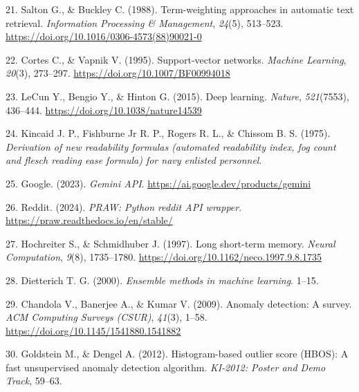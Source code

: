 \documentclass[
  12pt,
  letterpaper,
  DIV=11,
  numbers=noendperiod]{scrartcl}
\newlength{\cslhangindent}
\newenvironment{CSLReferences}[2] %
 {\begin{list}{}{%
  \setlength{\itemindent}{0pt}
  \setlength{\leftmargin}{0pt}
  \setlength{\parsep}{0pt}
  \ifodd #1
   \setlength{\leftmargin}{\cslhangindent}
   \setlength{\itemindent}{-1\cslhangindent}
  \fi
  \setlength{\itemsep}{#2\baselineskip}}}
 {\end{list}}
\begin{document}
\begin{CSLReferences}{1}{0}
21. Salton G., \& Buckley C. (1988). Term-weighting approaches in
automatic text retrieval. \emph{Information Processing \& Management},
\emph{24}(5), 513--523.
\url{https://doi.org/10.1016/0306-4573(88)90021-0}

22. Cortes C., \& Vapnik V. (1995). Support-vector networks.
\emph{Machine Learning}, \emph{20}(3), 273--297.
\url{https://doi.org/10.1007/BF00994018}

23. LeCun Y., Bengio Y., \& Hinton G. (2015). Deep learning.
\emph{Nature}, \emph{521}(7553), 436--444.
\url{https://doi.org/10.1038/nature14539}

24. Kincaid J. P., Fishburne Jr R. P., Rogers R. L., \& Chissom B. S.
(1975). \emph{Derivation of new readability formulas (automated
readability index, fog count and flesch reading ease formula) for navy
enlisted personnel}.

25. Google. (2023). \emph{Gemini API}.
\url{https://ai.google.dev/products/gemini}

26. Reddit. (2024). \emph{{PRAW}: Python reddit API wrapper}.
\url{https://praw.readthedocs.io/en/stable/}

27. Hochreiter S., \& Schmidhuber J. (1997). Long short-term memory.
\emph{Neural Computation}, \emph{9}(8), 1735--1780.
\url{https://doi.org/10.1162/neco.1997.9.8.1735}

28. Dietterich T. G. (2000). \emph{Ensemble methods in machine
learning}. 1--15.

29. Chandola V., Banerjee A., \& Kumar V. (2009). Anomaly detection: A
survey. \emph{ACM Computing Surveys (CSUR)}, \emph{41}(3), 1--58.
\url{https://doi.org/10.1145/1541880.1541882}

30. Goldstein M., \& Dengel A. (2012). Histogram-based outlier score
(HBOS): A fast unsupervised anomaly detection algorithm. \emph{KI-2012:
Poster and Demo Track}, 59--63.

\end{CSLReferences}
\end{document}
